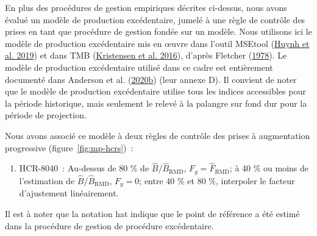 \documentclass[french,11pt]{book}
\begin{document}
En plus des procédures de gestion empiriques décrites ci-dessus, nous avons évalué un modèle de production excédentaire, jumelé à une règle de contrôle des prises en tant que procédure de gestion fondée sur un modèle. Nous utilisons ici le modèle de production excédentaire mis en œuvre dans l'outil MSEtool (\protect\hyperlink{ref-huynh_msetool_2019}{Huynh et al. 2019}) et dans TMB (\protect\hyperlink{ref-tmb}{Kristensen et al. 2016}), d'après Fletcher (\protect\hyperlink{ref-fletcher1978}{1978}). Le modèle de production excédentaire utilisé dans ce cadre est entièrement documenté dans Anderson et al. (\protect\hyperlink{ref-anderson2020gfmp}{2020b}) (leur annexe D). Il convient de noter que le modèle de production excédentaire utilise tous les indices accessibles pour la période historique, mais seulement le relevé à la palangre sur fond dur pour la période de projection.

Nous avons associé ce modèle à deux règles de contrôle des prises à augmentation progressive (figure~\ref{fig:mp-hcrs})~:
\begin{enumerate}
\def\labelenumi{\arabic{enumi}.}

\item
  HCR-8040~: Au-dessus de 80 \% de \(\hat{B}/\hat{B}_\textrm{RMD}\), \(F_y = \hat{F}_\textrm{RMD}\); à 40 \% ou moins de l'estimation de \(\hat{B}/\hat{B}_\textrm{RMD}\), \(F_y = 0\); entre 40 \% et 80 \%, interpoler le facteur d'ajustement linéairement.
\end{enumerate}
Il est à noter que la notation hat indique que le point de référence a été estimé dans la procédure de gestion de procédure excédentaire.
\end{document}
